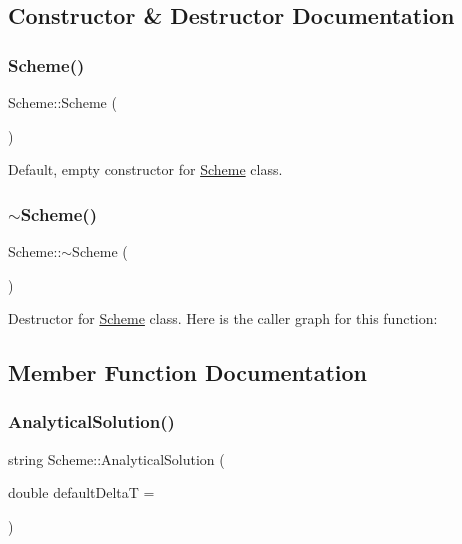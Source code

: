 \subsection{Constructor \& Destructor Documentation}
\mbox{\label{class_scheme_aa0b319a6594176dea40ca78562401b53}} 
\subsubsection{\texorpdfstring{Scheme()}{Scheme()}}
{\footnotesize\ttfamily Scheme\+::\+Scheme (\begin{DoxyParamCaption}{ }\end{DoxyParamCaption})}

Default, empty constructor for \mbox{\hyperlink{class_scheme}{Scheme}} class. \mbox{\label{class_scheme_af8f283786d3b27d97c55d92b9ae8b20b}} 
\subsubsection{\texorpdfstring{$\sim$\+Scheme()}{~Scheme()}}
{\footnotesize\ttfamily Scheme\+::$\sim$\+Scheme (\begin{DoxyParamCaption}{ }\end{DoxyParamCaption})\hspace{0.3cm}{\ttfamily [inline]}}

Destructor for \mbox{\hyperlink{class_scheme}{Scheme}} class. Here is the caller graph for this function\+:


\subsection{Member Function Documentation}
\mbox{\label{class_scheme_a7d3e9f8133a955517471eb7a6fea355f}} 
\subsubsection{\texorpdfstring{Analytical\+Solution()}{AnalyticalSolution()}}
{\footnotesize\ttfamily string Scheme\+::\+Analytical\+Solution (\begin{DoxyParamCaption}\item[{double}]{default\+DeltaT = {} }\end{DoxyParamCaption})}

